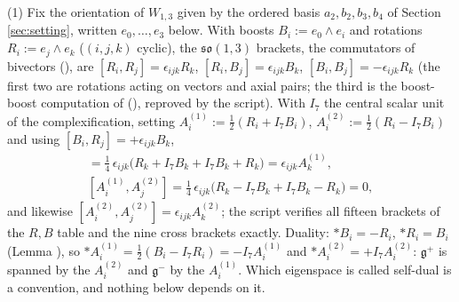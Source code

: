 (1) Fix the orientation of $W_{1,3}$ given by the ordered basis $a_2, b_2, b_3, b_4$ of Section \ref{sec:setting}, written $e_0, \dots, e_3$ below. With boosts $B_i := e_0\wedge e_i$ and rotations $R_i := e_j\wedge e_k$ ($(i,j,k)$ cyclic), the $\mathfrak{so}(1,3)$ brackets, the commutators of bivectors (), are $[R_i, R_j] = \epsilon_{ijk}R_k$, $[R_i, B_j] = \epsilon_{ijk}B_k$, $[B_i, B_j] = -\epsilon_{ijk}R_k$ (the first two are rotations acting on vectors and axial pairs; the third is the boost-boost computation of \cite[Lem.~5.4]{ButlerT6} (), reproved by the script). With $I_7$ the central scalar unit of the complexification, setting $A^{(1)}_i := \tfrac12(R_i + I_7B_i)$, $A^{(2)}_i := \tfrac12(R_i - I_7B_i)$ and using $[B_i, R_j] = +\epsilon_{ijk}B_k$,
\begin{gather*}
[A^{(1)}_i, A^{(1)}_j] = \tfrac14\,\epsilon_{ijk}\bigl(R_k + I_7B_k + I_7B_k + R_k\bigr) = \epsilon_{ijk}A^{(1)}_k,\\
[A^{(1)}_i, A^{(2)}_j] = \tfrac14\,\epsilon_{ijk}\bigl(R_k - I_7B_k + I_7B_k - R_k\bigr) = 0,
\end{gather*}
and likewise $[A^{(2)}_i, A^{(2)}_j] = \epsilon_{ijk}A^{(2)}_k$; the script verifies all fifteen brackets of the $R, B$ table and the nine cross brackets exactly. Duality: $\ast B_i = -R_i$, $\ast R_i = B_i$ (Lemma ), so $\ast A^{(1)}_i = \tfrac12(B_i - I_7R_i) = -I_7A^{(1)}_i$ and $\ast A^{(2)}_i = +I_7A^{(2)}_i$: $\mathfrak{g}^+$ is spanned by the $A^{(2)}_i$ and $\mathfrak{g}^-$ by the $A^{(1)}_i$. Which eigenspace is called self-dual is a convention, and nothing below depends on it.
